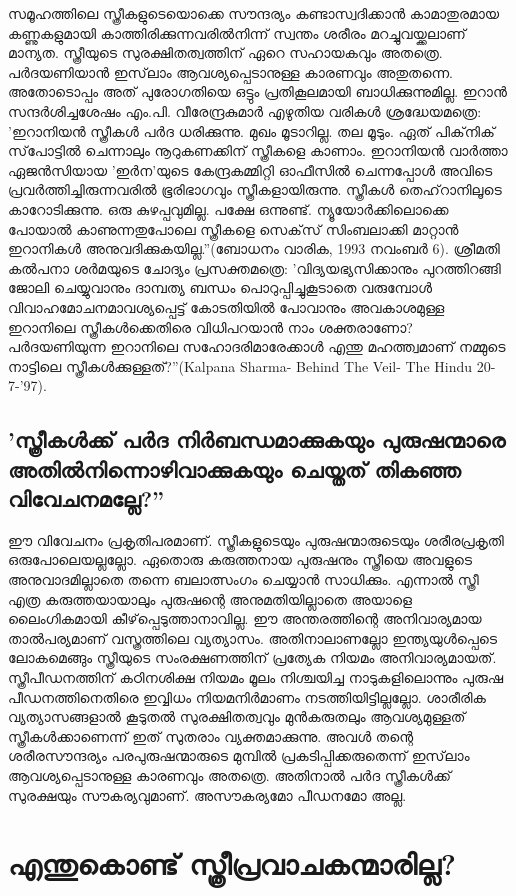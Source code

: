 സമൂഹത്തിലെ സ്ത്രീകളുടെയൊക്കെ സൗന്ദര്യം കണ്ടാസ്വദിക്കാന്‍ കാമാതുരമായ കണ്ണുകളുമായി കാത്തിരിക്കുന്നവരില്‍നിന്ന് സ്വന്തം ശരീരം മറച്ചുവയ്ക്കലാണ് മാന്യത. സ്ത്രീയുടെ സുരക്ഷിതത്വത്തിന് ഏറെ സഹായകവും അതത്രെ. പര്‍ദയണിയാന്‍ ഇസ്‌ലാം ആവശ്യപ്പെടാനുള്ള കാരണവും അതുതന്നെ. അതോടൊപ്പം അത് പുരോഗതിയെ ഒട്ടും പ്രതികൂലമായി ബാധിക്കുന്നുമില്ല. ഇറാന്‍ സന്ദര്‍ശിച്ചശേഷം എം.പി. വീരേന്ദ്രകുമാര്‍ എഴുതിയ വരികള്‍ ശ്രദ്ധേയമത്രെ: 'ഇറാനിയന്‍ സ്ത്രീകള്‍ പര്‍ദ ധരിക്കുന്നു. മുഖം മൂടാറില്ല. തല മൂടും. ഏത് പിക്‌നിക് സ്‌പോട്ടില്‍ ചെന്നാലും നൂറുകണക്കിന് സ്ത്രീകളെ കാണാം. ഇറാനിയന്‍ വാര്‍ത്താ ഏജന്‍സിയായ 'ഇര്‍ന'യുടെ കേന്ദ്രകമ്മിറ്റി ഓഫീസില്‍ ചെന്നപ്പോള്‍ അവിടെ പ്രവര്‍ത്തിച്ചിരുന്നവരില്‍ ഭൂരിഭാഗവും സ്ത്രീകളായിരുന്നു. സ്ത്രീകള്‍ തെഹ്‌റാനിലൂടെ കാറോടിക്കുന്നു. ഒരു കുഴപ്പവുമില്ല. പക്ഷേ ഒന്നുണ്ട്. ന്യൂയോര്‍ക്കിലൊക്കെ പോയാല്‍ കാണുന്നതുപോലെ സ്ത്രീകളെ സെക്‌സ് സിംബലാക്കി മാറ്റാന്‍ ഇറാനികള്‍ അനുവദിക്കുകയില്ല.''(ബോധനം വാരിക, 1993 നവംബര്‍ 6).
ശ്രീമതി കല്‍പനാ ശര്‍മയുടെ ചോദ്യം പ്രസക്തമത്രെ: 'വിദ്യയഭ്യസിക്കാനും പുറത്തിറങ്ങി ജോലി ചെയ്യുവാനും ദാമ്പത്യ ബന്ധം പൊറുപ്പിച്ചുകൂടാതെ വരുമ്പോള്‍ വിവാഹമോചനമാവശ്യപ്പെട്ട് കോടതിയില്‍ പോവാനും അവകാശമുള്ള ഇറാനിലെ സ്ത്രീകള്‍ക്കെതിരെ വിധിപറയാന്‍ നാം ശക്തരാണോ? പര്‍ദയണിയുന്ന ഇറാനിലെ സഹോദരിമാരേക്കാള്‍ എന്തു മഹത്ത്വമാണ് നമ്മുടെ നാട്ടിലെ സ്ത്രീകള്‍ക്കുള്ളത്?''(Kalpana Sharma- Behind The Veil- The Hindu 20- 7-'97).

\section{'സ്ത്രീകള്‍ക്ക് പര്‍ദ നിര്‍ബന്ധമാക്കുകയും പുരുഷന്മാരെ അതില്‍നിന്നൊഴിവാക്കുകയും ചെയ്തത് തികഞ്ഞ വിവേചനമല്ലേ?''}
ഈ വിവേചനം പ്രകൃതിപരമാണ്. സ്ത്രീകളുടെയും പുരുഷന്മാരുടെയും ശരീരപ്രകൃതി ഒരുപോലെയല്ലല്ലോ. ഏതൊരു കരുത്തനായ പുരുഷനും സ്ത്രീയെ അവളുടെ അനുവാദമില്ലാതെ തന്നെ ബലാത്സംഗം ചെയ്യാന്‍ സാധിക്കും. എന്നാല്‍ സ്ത്രീ എത്ര കരുത്തയായാലും പുരുഷന്റെ അനുമതിയില്ലാതെ അയാളെ ലൈംഗികമായി കീഴ്‌പ്പെടുത്താനാവില്ല. ഈ അന്തരത്തിന്റെ അനിവാര്യമായ താല്‍പര്യമാണ് വസ്ത്രത്തിലെ വ്യത്യാസം. അതിനാലാണല്ലോ ഇന്ത്യയുള്‍പ്പെടെ ലോകമെങ്ങും സ്ത്രീയുടെ സംരക്ഷണത്തിന് പ്രത്യേക നിയമം അനിവാര്യമായത്. സ്ത്രീപീഡനത്തിന് കഠിനശിക്ഷ നിയമം മൂലം നിശ്ചയിച്ച നാടുകളിലൊന്നും പുരുഷ പീഡനത്തിനെതിരെ ഇവ്വിധം നിയമനിര്‍മാണം നടത്തിയിട്ടില്ലല്ലോ. ശാരീരിക വ്യത്യാസങ്ങളാല്‍ കൂടുതല്‍ സുരക്ഷിതത്വവും മുന്‍കരുതലും ആവശ്യമുള്ളത് സ്ത്രീകള്‍ക്കാണെന്ന് ഇത് സുതരാം വ്യക്തമാക്കുന്നു. അവള്‍ തന്റെ ശരീരസൗന്ദര്യം പരപുരുഷന്മാരുടെ മുമ്പില്‍ പ്രകടിപ്പിക്കരുതെന്ന് ഇസ്‌ലാം ആവശ്യപ്പെടാനുള്ള കാരണവും അതത്രെ. അതിനാല്‍ പര്‍ദ സ്ത്രീകള്‍ക്ക് സുരക്ഷയും സൗകര്യവുമാണ്. അസൗകര്യമോ പീഡനമോ അല്ല.
\chapter{എന്തുകൊണ്ട് സ്ത്രീപ്രവാചകന്മാരില്ല? }
